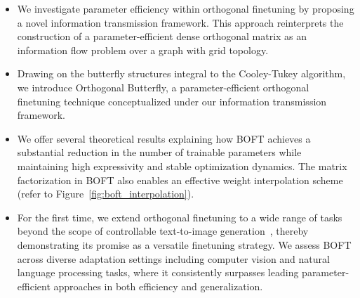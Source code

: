 \begin{itemize}[leftmargin=*,nosep]
    \item We investigate parameter efficiency within orthogonal finetuning by proposing a novel information transmission framework. This approach reinterprets the construction of a parameter-efficient dense orthogonal matrix as an information flow problem over a graph with grid topology.
    \item Drawing on the butterfly structures integral to the Cooley-Tukey algorithm, we introduce Orthogonal Butterfly, a parameter-efficient orthogonal finetuning technique conceptualized under our information transmission framework.
    \item We offer several theoretical results explaining how BOFT achieves a substantial reduction in the number of trainable parameters while maintaining high expressivity and stable optimization dynamics. The matrix factorization in BOFT also enables an effective weight interpolation scheme (refer to Figure~\ref{fig:boft_interpolation}).
    \item For the first time, we extend orthogonal finetuning to a wide range of tasks beyond the scope of controllable text-to-image generation~\cite{qiu2023controlling}, thereby demonstrating its promise as a versatile finetuning strategy. We assess BOFT across diverse adaptation settings including computer vision and natural language processing tasks, where it consistently surpasses leading parameter-efficient approaches in both efficiency and generalization.
\end{itemize}

